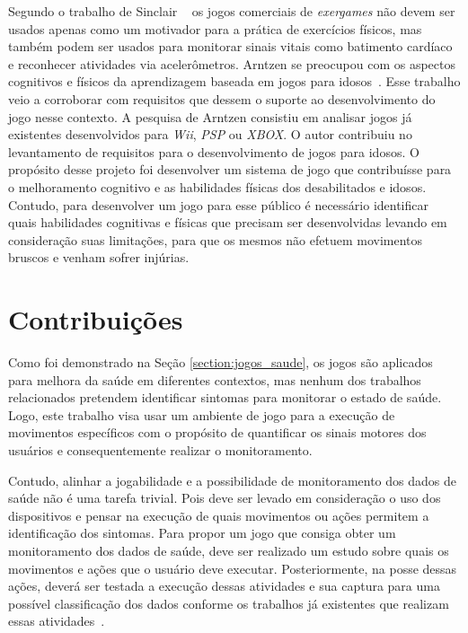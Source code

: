 Segundo o trabalho de Sinclair ~\cite{Sinclair:2009:UVB:1515604.1515617} os jogos comerciais de \textit{exergames} não devem ser usados apenas como um motivador para a prática de exercícios físicos, mas também podem ser usados para monitorar sinais vitais como batimento cardíaco e reconhecer atividades via acelerômetros. Arntzen se preocupou com os aspectos cognitivos e físicos da aprendizagem baseada em jogos para idosos~\cite{arntzen2011}. Esse trabalho veio a corroborar com requisitos que dessem o suporte ao desenvolvimento do jogo nesse contexto. A pesquisa de Arntzen consistiu em analisar jogos já existentes desenvolvidos para \textit{Wii}, \textit{PSP} ou \textit{XBOX}. O autor contribuiu no levantamento de requisitos para o desenvolvimento de jogos para idosos. O propósito desse projeto foi desenvolver um sistema de jogo que contribuísse para o melhoramento cognitivo e as habilidades físicas dos desabilitados e idosos. Contudo, para desenvolver um jogo para esse público é necessário identificar quais habilidades cognitivas e físicas que precisam ser desenvolvidas levando em consideração suas limitações, para que os mesmos não efetuem movimentos bruscos e venham sofrer injúrias.

\section{Contribuições}
Como foi demonstrado na Seção \ref{section:jogos_saude}, os jogos são aplicados para melhora da saúde em diferentes contextos, mas nenhum dos trabalhos relacionados pretendem identificar sintomas para monitorar o estado de saúde. Logo, este trabalho visa usar um ambiente de jogo para a execução de movimentos específicos com o propósito de quantificar os sinais motores dos usuários e consequentemente realizar o monitoramento.

Contudo, alinhar a jogabilidade e a possibilidade de monitoramento dos dados de saúde não é uma tarefa trivial. Pois deve ser levado em consideração o uso dos dispositivos e pensar na execução de quais movimentos ou ações permitem a identificação dos sintomas. Para propor um jogo que consiga obter um monitoramento dos dados de saúde, deve ser realizado um estudo sobre quais os movimentos e ações que o usuário deve executar. Posteriormente, na posse dessas ações, deverá ser testada a execução dessas atividades e sua captura para uma possível classificação dos dados conforme os trabalhos já existentes que realizam essas atividades~\cite{Ballegaard:2008:HEL:1357054.1357336,albanese2012,bachlin_parkinsons_2009,visionbased2009,patel_monitoring_2009}.

